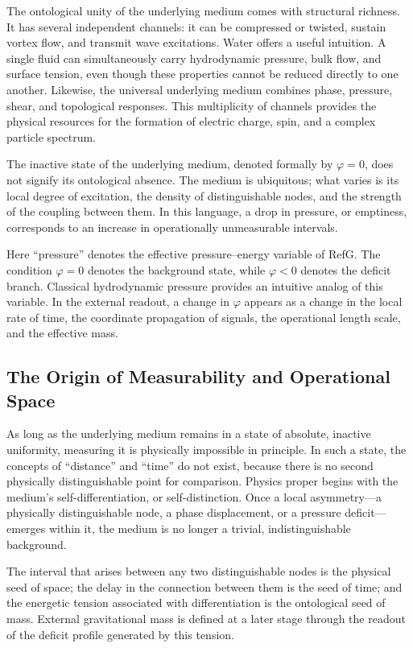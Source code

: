 \documentclass[11pt,a4paper]{article}
\begin{document}
The ontological unity of the underlying medium comes with structural richness. It has several independent channels: it can be compressed or twisted, sustain vortex flow, and transmit wave excitations. Water offers a useful intuition. A single fluid can simultaneously carry hydrodynamic pressure, bulk flow, and surface tension, even though these properties cannot be reduced directly to one another. Likewise, the universal underlying medium combines phase, pressure, shear, and topological responses. This multiplicity of channels provides the physical resources for the formation of electric charge, spin, and a complex particle spectrum.

The inactive state of the underlying medium, denoted formally by $\varphi=0$, does not signify its ontological absence. The medium is ubiquitous; what varies is its local degree of excitation, the density of distinguishable nodes, and the strength of the coupling between them. In this language, a drop in pressure, or emptiness, corresponds to an increase in operationally unmeasurable intervals.

Here ``pressure'' denotes the effective pressure--energy variable of RefG. The condition $\varphi=0$ denotes the background state, while $\varphi<0$ denotes the deficit branch. Classical hydrodynamic pressure provides an intuitive analog of this variable. In the external readout, a change in $\varphi$ appears as a change in the local rate of time, the coordinate propagation of signals, the operational length scale, and the effective mass.

\subsection{The Origin of Measurability and Operational Space}

As long as the underlying medium remains in a state of absolute, inactive uniformity, measuring it is physically impossible in principle. In such a state, the concepts of ``distance'' and ``time'' do not exist, because there is no second physically distinguishable point for comparison. Physics proper begins with the medium's self-differentiation, or self-distinction. Once a local asymmetry---a physically distinguishable node, a phase displacement, or a pressure deficit---emerges within it, the medium is no longer a trivial, indistinguishable background.

The interval that arises between any two distinguishable nodes is the physical seed of space; the delay in the connection between them is the seed of time; and the energetic tension associated with differentiation is the ontological seed of mass. External gravitational mass is defined at a later stage through the readout of the deficit profile generated by this tension.
\end{document}
